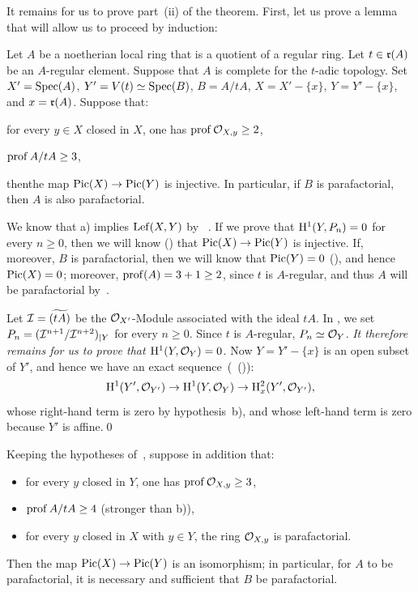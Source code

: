 \medskip
It remains for us to prove part~(ii) of the theorem. First, let us prove a lemma that will allow us to proceed by induction:

\begin{lemme} \label{XI.3.16}
Let $A$ be a noetherian local ring that is a quotient of a regular ring. Let $t\in\rr(A)$ be an $A$-regular element. Suppose that $A$ is complete for the $t$-adic topology. Set $X'=\Spec(A)$, $Y'=V(t)\simeq \Spec(B)$, $B=A/tA$, $X=X'-\{x\}$, $Y=Y'-\{x\}$, and $x=\rr(A)$. Suppose that:
\begin{enumeratea}
\item
for every $y\in X$ closed in $X$, one has $\prof\Oo_{X, y}\geq 2$,
\item
$\prof A/tA\geq 3$,
\end{enumeratea}
\noindent
then\pageoriginale the map $\Pic(X)\to\Pic(Y)$ is injective. In particular, if $B$ is parafactorial, then $A$ is also parafactorial.
\end{lemme}

We know that a) implies $\Lef(X, Y)$ by ~. If we prove that $\H^1(Y, P_n)=0$ for every $n\geq 0$, then we will know  () that $\Pic(X)\to\Pic(Y)$ is injective. If, moreover, $B$ is parafactorial, then we will know that $\Pic(Y)=0$ (), and hence $\Pic(X)=0$; moreover, $\prof(A)=3+1\geq 2$, since $t$ is $A$-regular, and thus $A$ will be parafactorial by~.

Let $\Ii=\widetilde{(tA)}$ be the $\Oo_{X'}$-Module associated with the ideal $tA$. In \numero {}, we set $P_n = \sisi{(\Ii^{n+1}/\Ii^{n+2}){|Y}}{(\Ii^{n+1}/\Ii^{n+2})_{|Y}}$ for every $n\geq 0$. Since $t$ is $A$-regular, $P_n\simeq \Oo_Y$. \emph{It therefore remains for us to prove that $\H^1(Y, \Oo_Y)=0$.} Now $Y = Y'-\{x\}$ is an open subset of $Y'$, and hence we have an exact sequence~(~()):
\[
\H^1(Y', \Oo_{Y'})\to\H^1(Y, \Oo_{Y})\to\H^2_x(Y', \Oo_{Y'}){\quoi},
\]
whose right-hand term is zero by hypothesis~b), and whose left-hand term is zero because $Y'$ is affine.\qed

\begin{lemme} \label{XI.3.17}
Keeping the hypotheses of~, suppose in addition that:
\begin{itemize}
\item[c)] for every $y$ closed in $Y$, one has $\prof\Oo_{X, y}\geq 3$,
\item[d)] $\prof A/tA\geq 4$ (stronger than b)),
\item[e)] for every $y$ closed in $X$ with $y\in Y$, the ring $\Oo_{X, y}$ is parafactorial.
\end{itemize}
Then the map $\Pic(X)\to\Pic(Y)$ is an isomorphism; in particular, for $A$ to be parafactorial, it is necessary and sufficient that $B$ be parafactorial.
\end{lemme}

